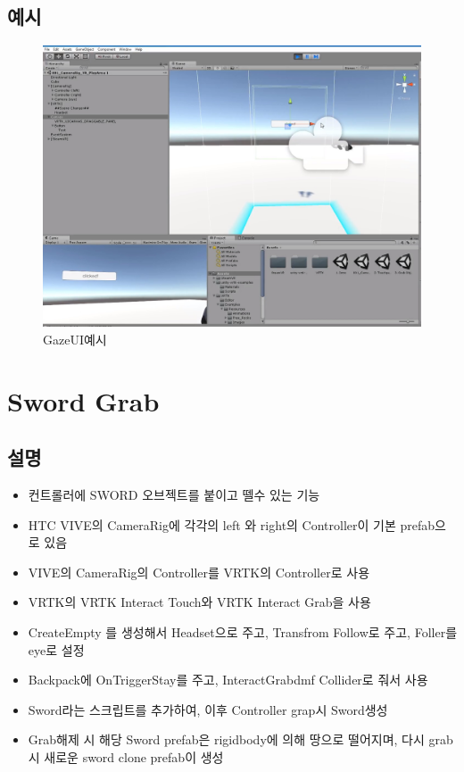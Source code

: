 \documentclass{report}
\begin{document}
    \subsection{예시}
    
    \begin{figure}[h!]
    \centering
    \includegraphics[width=1.0\textwidth]{vrtk4-1.jpg}
    \caption{GazeUI예시}
    \end{figure}
    
 
    
    
    \section{Sword Grab}
    
    \subsection{설명}
    
    \begin{itemize}

    \item 컨트롤러에 SWORD 오브젝트를 붙이고 뗄수 있는 기능
    \item HTC VIVE의 CameraRig에 각각의 left 와 right의 Controller이 기본 prefab으로 있음
    \item VIVE의 CameraRig의 Controller를 VRTK의 Controller로 사용
    \item VRTK의 VRTK Interact Touch와 VRTK Interact Grab을 사용
    \item CreateEmpty 를 생성해서 Headset으로 주고, Transfrom Follow로 주고, Foller를 eye로 설정
    \item Backpack에 OnTriggerStay를 주고, InteractGrabdmf Collider로 줘서 사용
    \item Sword라는 스크립트를 추가하여, 이후 Controller grap시 Sword생성
    \item Grab해제 시 해당 Sword prefab은 rigidbody에 의해 땅으로 떨어지며, 다시 grab시 새로운 sword clone prefab이 생성

    \end{itemize}
    
\end{document}
